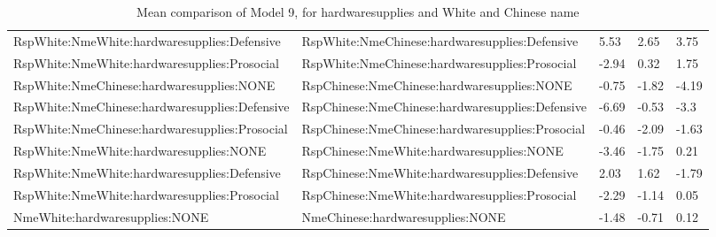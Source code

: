 \documentclass[]{report}
\begin{document}
\begin{table}[ht]
{\begin{tabular}{lllll}
		RspWhite:NmeWhite:hardwaresupplies:Defensive  &  RspWhite:NmeChinese:hardwaresupplies:Defensive & 5.53 & 2.65 & 3.75 \\ 
		RspWhite:NmeWhite:hardwaresupplies:Prosocial  &  RspWhite:NmeChinese:hardwaresupplies:Prosocial & -2.94 & 0.32 & 1.75 \\ 
		RspWhite:NmeChinese:hardwaresupplies:NONE  &  RspChinese:NmeChinese:hardwaresupplies:NONE & -0.75 & -1.82 & -4.19 \\ 
		RspWhite:NmeChinese:hardwaresupplies:Defensive  &  RspChinese:NmeChinese:hardwaresupplies:Defensive & -6.69 & -0.53 & -3.3 \\ 
		RspWhite:NmeChinese:hardwaresupplies:Prosocial  &  RspChinese:NmeChinese:hardwaresupplies:Prosocial & -0.46 & -2.09 & -1.63 \\ 
		RspWhite:NmeWhite:hardwaresupplies:NONE  &  RspChinese:NmeWhite:hardwaresupplies:NONE & -3.46 & -1.75 & 0.21 \\ 
		RspWhite:NmeWhite:hardwaresupplies:Defensive  &  RspChinese:NmeWhite:hardwaresupplies:Defensive & 2.03 & 1.62 & -1.79 \\ 
		RspWhite:NmeWhite:hardwaresupplies:Prosocial  &  RspChinese:NmeWhite:hardwaresupplies:Prosocial & -2.29 & -1.14 & 0.05 \\ 
		NmeWhite:hardwaresupplies:NONE  &  NmeChinese:hardwaresupplies:NONE & -1.48 & -0.71 & 0.12 \\ 
		\hline
	\end{tabular}}
	\caption{Mean comparison of Model 9, for  hardwaresupplies  and White and Chinese name} 
\end{table}
\end{document}

